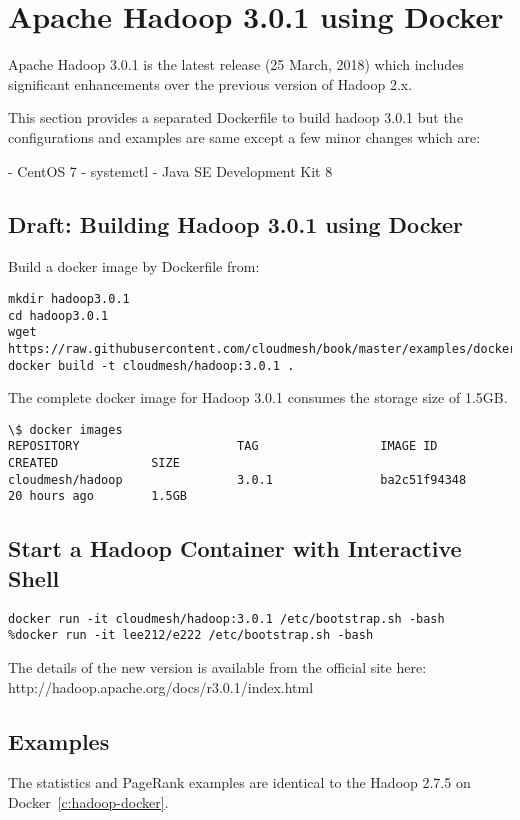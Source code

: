 \label{c:hadoop3-docker}
\chapter{Apache Hadoop 3.0.1 using Docker}

Apache Hadoop 3.0.1 is the latest release (25 March, 2018) which includes significant enhancements over the previous version of Hadoop 2.x.

This section provides a separated Dockerfile to build hadoop 3.0.1 but the configurations and examples are same except a few minor changes which are:

- CentOS 7 
- systemctl
- Java SE Development Kit 8

\section{Draft: Building Hadoop 3.0.1 using Docker}

Build a docker image by Dockerfile from:

\begin{lstlisting}
mkdir hadoop3.0.1
cd hadoop3.0.1
wget https://raw.githubusercontent.com/cloudmesh/book/master/examples/docker/hadoop/3.0.1/Dockerfile
docker build -t cloudmesh/hadoop:3.0.1 .
\end{lstlisting}

The complete docker image for Hadoop 3.0.1 consumes the storage size of 1.5GB.

\begin{lstlisting}
\$ docker images
REPOSITORY                      TAG                 IMAGE ID            CREATED             SIZE
cloudmesh/hadoop                3.0.1               ba2c51f94348        20 hours ago        1.5GB
\end{lstlisting}


\section{Start a Hadoop Container with Interactive Shell}

\begin{lstlisting}
docker run -it cloudmesh/hadoop:3.0.1 /etc/bootstrap.sh -bash
%docker run -it lee212/e222 /etc/bootstrap.sh -bash
\end{lstlisting}

The details of the new version is available from the official site here: http://hadoop.apache.org/docs/r3.0.1/index.html

\section{Examples}

The statistics and PageRank examples are identical to the Hadoop 2.7.5 on Docker~\ref{c:hadoop-docker}. 

